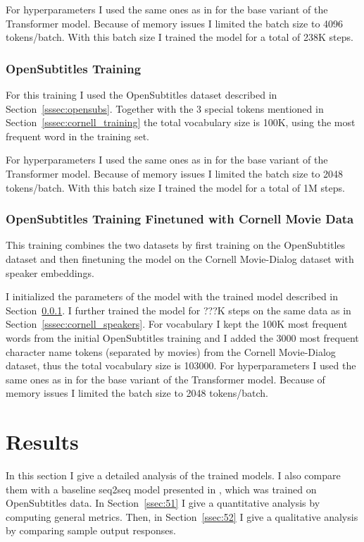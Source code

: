 \documentclass[12pt]{article}
\begin{document}
For hyperparameters I used the same ones as in \cite{Vaswani:2017} for the base variant of the Transformer model. Because of memory issues I limited the batch size to 4096 tokens/batch. With this batch size I trained the model for a total of 238K steps.
\subsubsection{OpenSubtitles Training} \label{sssec:opensubs_training}
For this training I used the OpenSubtitles dataset described in Section~\ref{sssec:opensubs}. Together with the 3 special tokens mentioned in Section~\ref{sssec:cornell_training} the total vocabulary size is 100K, using the most frequent word in the training set.

For hyperparameters I used the same ones as in \cite{Vaswani:2017} for the base variant of the Transformer model. Because of memory issues I limited the batch size to 2048 tokens/batch. With this batch size I trained the model for a total of 1M steps.
\subsubsection{OpenSubtitles Training Finetuned with Cornell Movie Data} \label{sssec:finetune_training}
This training combines the two datasets by first training on the OpenSubtitles dataset and then finetuning the model on the Cornell Movie-Dialog dataset with speaker embeddings. 

I initialized the parameters of the model with the trained model described in Section~\ref{sssec:opensubs_training}. I further trained the model for ???K steps on the same data as in Section~\ref{sssec:cornell_speakers}. For vocabulary I kept the 100K most frequent words from the initial OpenSubtitles training and I added the 3000 most frequent character name tokens (separated by movies) from the Cornell Movie-Dialog dataset, thus the total vocabulary size is 103000. For hyperparameters I used the same ones as in \cite{Vaswani:2017} for the base variant of the Transformer model. Because of memory issues I limited the batch size to 2048 tokens/batch.

\newpage\section{Results} \label{sec:results}
In this section I give a detailed analysis of the trained models. I also compare them with a baseline seq2seq model presented in \cite{Vinyals:2015}, which was trained on OpenSubtitles data. In Section~\ref{ssec:51} I give a quantitative analysis by computing general metrics. Then, in Section~\ref{ssec:52} I give a qualitative analysis by comparing sample output responses.
\end{document}

